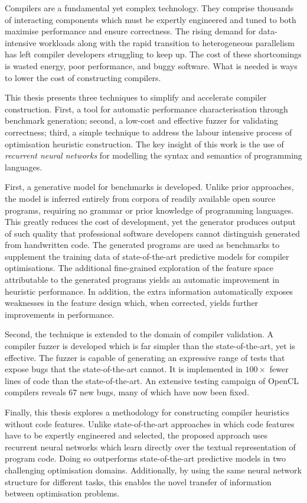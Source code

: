 Compilers are a fundamental yet complex technology. They comprise thousands of interacting components which must be expertly engineered and tuned to both maximise performance and ensure correctness. The rising demand for data-intensive workloads along with the rapid transition to heterogeneous parallelism has left compiler developers struggling to keep up. The cost of these shortcomings is wasted energy, poor performance, and buggy software. What is needed is ways to lower the cost of constructing compilers.

This thesis presents three techniques to simplify and accelerate compiler construction. First, a tool for automatic performance characterisation through benchmark generation; second, a low-cost and effective fuzzer for validating correctness; third, a simple technique to address the labour intensive process of optimisation heuristic construction. The key insight of this work is the use of \emph{recurrent neural networks} for modelling the syntax and semantics of programming languages.

First, a generative model for benchmarks is developed. Unlike prior approaches, the model is inferred entirely from corpora of readily available open source programs, requiring no grammar or prior knowledge of programming languages. This greatly reduces the cost of development, yet the generator produces output of such quality that professional software developers cannot distinguish generated from handwritten code. The generated programs are used as benchmarks to supplement the training data of state-of-the-art predictive models for compiler optimisations. The additional fine-grained exploration of the feature space attributable to the generated programs yields an automatic improvement in heuristic performance. In addition, the extra information automatically exposes weaknesses in the feature design which, when corrected, yields further improvements in performance.

Second, the technique is extended to the domain of compiler validation. A compiler fuzzer is developed which is far simpler than the state-of-the-art, yet is effective. The fuzzer is capable of generating an expressive range of tests that expose bugs that the state-of-the-art cannot. It is implemented in $100\times$ fewer lines of code than the state-of-the-art. An extensive testing campaign of OpenCL compilers reveals 67 new bugs, many of which have now been fixed.

Finally, this thesis explores a methodology for constructing compiler heuristics without code features. Unlike state-of-the-art approaches in which code features have to be expertly engineered and selected, the proposed approach uses recurrent neural networks which learn directly over the textual representation of program code. Doing so outperforms state-of-the-art predictive models in two challenging optimisation domains. Additionally, by using the same neural network structure for different tasks, this enables the novel transfer of information between optimisation problems.
